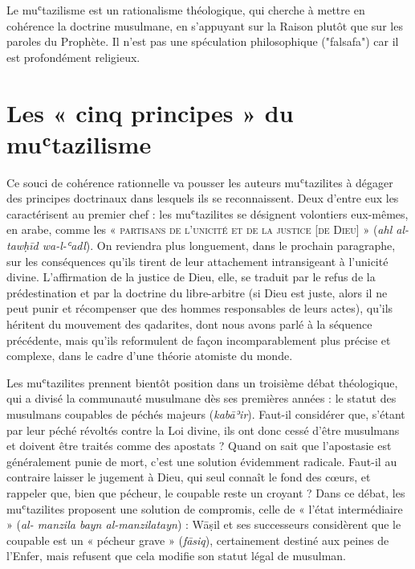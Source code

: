 \begin{Synthesis}
Le muʿtazilisme est un rationalisme théologique, qui cherche à mettre en cohérence la doctrine musulmane, en s'appuyant sur la Raison plutôt que sur les paroles du Prophète. Il n'est pas une spéculation philosophique ("falsafa") car il est profondément religieux.
\end{Synthesis}
\hypertarget{les-cinq-principes-du-muux2bftazilisme}{%
\section{Les « cinq principes » du
muʿtazilisme}\label{les-cinq-principes-du-muux2bftazilisme}}

Ce souci de cohérence rationnelle va pousser les auteurs muʿtazilites à
dégager des principes doctrinaux dans lesquels ils se reconnaissent.
Deux d'entre eux les caractérisent au premier chef : les muʿtazilites se
désignent volontiers eux-mêmes, en arabe, comme les
\textsc{« partisans de l'unicité et de la justice {[}de Dieu{]} » }(\emph{ahl
al-tawḥīd wa-l-ʿadl}). On reviendra plus longuement, dans le prochain
paragraphe, sur les conséquences qu'ils tirent de leur attachement
intransigeant à l'unicité divine. L'affirmation de la justice de Dieu,
elle, se traduit par le refus de la prédestination et par la doctrine du
libre-arbitre (si Dieu est juste, alors il ne peut punir et récompenser
que des hommes responsables de leurs actes), qu'ils héritent du
mouvement des qadarites, dont nous avons parlé à la séquence précédente,
mais qu'ils reformulent de façon incomparablement plus précise et
complexe, dans le cadre d'une théorie atomiste du monde.

Les muʿtazilites prennent bientôt position dans un troisième débat
théologique, qui a divisé la communauté musulmane dès ses premières
années : le statut des musulmans coupables de péchés majeurs
(\emph{kabāʾir}). Faut-il considérer que, s'étant par leur péché
révoltés contre la Loi divine, ils ont donc cessé d'être musulmans et
doivent être traités comme des apostats ? Quand on sait que l'apostasie
est généralement punie de mort, c'est une solution évidemment radicale.
Faut-il au contraire laisser le jugement à Dieu, qui seul connaît le
fond des cœurs, et rappeler que, bien que pécheur, le coupable reste un
croyant ? Dans ce débat, les muʿtazilites proposent une solution de
compromis, celle de « l'état intermédiaire » (\emph{al- manzila bayn
al-manzilatayn}) : Wāṣil et ses successeurs considèrent que le coupable
est un
« pécheur grave » (\emph{fāsiq}), certainement destiné aux peines de
l'Enfer, mais refusent que cela
modifie son statut légal de musulman.

